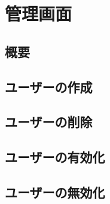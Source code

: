     \section{管理画面}
        \subsection{概要}
        \subsection{ユーザーの作成}
        \subsection{ユーザーの削除}
        \subsection{ユーザーの有効化}
        \subsection{ユーザーの無効化}


